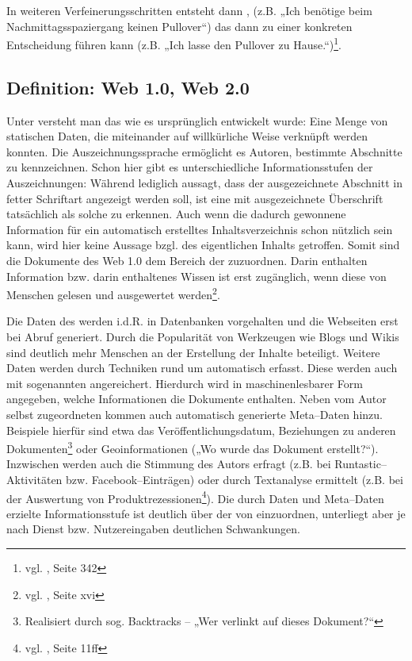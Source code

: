 In weiteren Verfeinerungsschritten entsteht dann , (z.B. „Ich benötige beim Nachmittagsspaziergang keinen Pullover“) das dann zu einer konkreten Entscheidung führen kann (z.B. „Ich lasse den Pullover zu Hause.“)\footnote{vgl. \cite{taylor}, Seite 342}.

\subsection{Definition: Web 1.0, Web 2.0}

Unter  versteht man das  wie es ursprünglich entwickelt wurde: Eine Menge von statischen Daten, die miteinander auf willkürliche Weise verknüpft werden konnten. Die Auszeichnungssprache  ermöglicht es Autoren, bestimmte Abschnitte zu kennzeichnen. Schon hier gibt es unterschiedliche Informationsstufen der Auszeichnungen: Während  lediglich aussagt, dass der ausgezeichnete Abschnitt in fetter Schriftart angezeigt werden soll, ist eine mit  ausgezeichnete Überschrift tatsächlich als solche zu erkennen. Auch wenn die dadurch gewonnene Information für ein automatisch erstelltes Inhaltsverzeichnis schon nützlich sein kann, wird hier keine Aussage bzgl. des eigentlichen Inhalts getroffen. Somit sind die Dokumente des Web 1.0 dem Bereich der  zuzuordnen. Darin enthalten Information bzw. darin enthaltenes Wissen ist erst zugänglich, wenn diese von Menschen gelesen und ausgewertet werden\footnote{vgl. \cite{alkhatib}, Seite xvi}.

Die Daten des  werden i.d.R. in Datenbanken vorgehalten und die Webseiten erst bei Abruf generiert. Durch die Popularität von Werkzeugen wie Blogs und Wikis sind deutlich mehr Menschen an der Erstellung der Inhalte beteiligt. Weitere Daten werden durch Techniken rund um  automatisch erfasst. Diese werden auch mit sogenannten  angereichert. Hierdurch wird in maschinenlesbarer Form angegeben, welche Informationen die Dokumente enthalten. Neben vom Autor selbst zugeordneten  kommen auch automatisch generierte Meta--Daten hinzu. Beispiele hierfür sind etwa das Veröffentlichungsdatum, Beziehungen zu anderen Dokumenten\footnote{Realisiert durch sog. Backtracks -- „Wer verlinkt auf dieses Dokument?“} oder Geoinformationen („Wo wurde das Dokument erstellt?“). Inzwischen werden auch die Stimmung des Autors erfragt (z.B. bei Runtastic–Aktivitäten bzw. Facebook--Einträgen) oder durch Textanalyse ermittelt (z.B. bei der Auswertung von Produktrezessionen\footnote{vgl. \cite{sprejz}, Seite 11ff}). Die durch Daten und Meta--Daten erzielte Informationsstufe ist deutlich über der von  einzuordnen, unterliegt aber je nach Dienst bzw. Nutzereingaben deutlichen Schwankungen.

